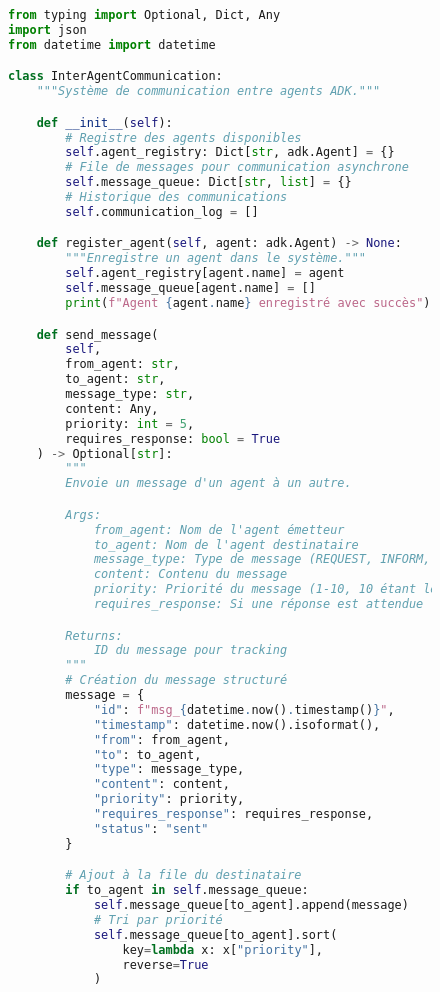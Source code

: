 \begin{figure}[h]
\centering
\begin{lstlisting}[language=Python, caption=Architecture de communication inter-agents]
from typing import Optional, Dict, Any
import json
from datetime import datetime

class InterAgentCommunication:
    """Système de communication entre agents ADK."""

    def __init__(self):
        # Registre des agents disponibles
        self.agent_registry: Dict[str, adk.Agent] = {}
        # File de messages pour communication asynchrone
        self.message_queue: Dict[str, list] = {}
        # Historique des communications
        self.communication_log = []

    def register_agent(self, agent: adk.Agent) -> None:
        """Enregistre un agent dans le système."""
        self.agent_registry[agent.name] = agent
        self.message_queue[agent.name] = []
        print(f"Agent {agent.name} enregistré avec succès")

    def send_message(
        self,
        from_agent: str,
        to_agent: str,
        message_type: str,
        content: Any,
        priority: int = 5,
        requires_response: bool = True
    ) -> Optional[str]:
        """
        Envoie un message d'un agent à un autre.

        Args:
            from_agent: Nom de l'agent émetteur
            to_agent: Nom de l'agent destinataire
            message_type: Type de message (REQUEST, INFORM, QUERY, etc.)
            content: Contenu du message
            priority: Priorité du message (1-10, 10 étant le plus urgent)
            requires_response: Si une réponse est attendue

        Returns:
            ID du message pour tracking
        """
        # Création du message structuré
        message = {
            "id": f"msg_{datetime.now().timestamp()}",
            "timestamp": datetime.now().isoformat(),
            "from": from_agent,
            "to": to_agent,
            "type": message_type,
            "content": content,
            "priority": priority,
            "requires_response": requires_response,
            "status": "sent"
        }

        # Ajout à la file du destinataire
        if to_agent in self.message_queue:
            self.message_queue[to_agent].append(message)
            # Tri par priorité
            self.message_queue[to_agent].sort(
                key=lambda x: x["priority"],
                reverse=True
            )


\end{lstlisting}
\end{figure}
